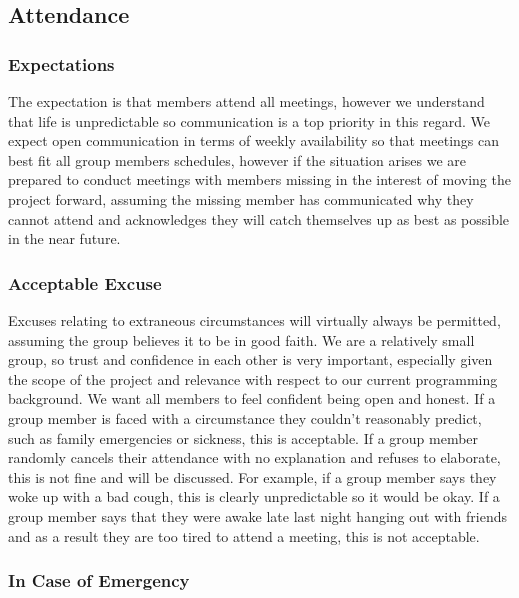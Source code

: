 \documentclass{article}
\begin{document}
\subsection*{Attendance}

\subsubsection*{Expectations}

The expectation is that members attend all meetings, however we understand that life is unpredictable so communication is a top priority in this regard. We expect open communication in terms of weekly availability so that meetings can best fit all group members schedules, however if the situation arises we are prepared to conduct meetings with members missing in the interest of moving the project forward, assuming the missing member has communicated why they cannot attend and acknowledges they will catch themselves up as best as possible in the near future.

\subsubsection*{Acceptable Excuse}

Excuses relating to extraneous circumstances will virtually always be permitted, assuming the group believes it to be in good faith. We are a relatively small group, so trust and confidence in each other is very important, especially given the scope of the project and relevance with respect to our current programming background. We want all members to feel confident being open and honest. If a group member is faced with a circumstance they couldn't reasonably predict, such as family emergencies or sickness, this is acceptable. If a group member randomly cancels their attendance with no explanation and refuses to elaborate, this is not fine and will be discussed. For example, if a group member says they woke up with a bad cough, this is clearly unpredictable so it would be okay. If a group member says that they were awake late last night hanging out with friends and as a result they are too tired to attend a meeting, this is not acceptable. 

\subsubsection*{In Case of Emergency}
\end{document}
